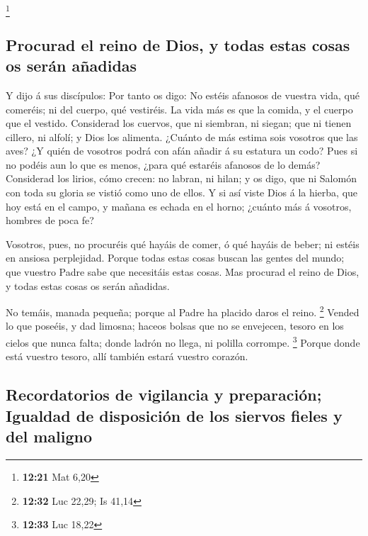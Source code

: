 \footnote{\textbf{12:21} Mat 6,20}

\hypertarget{procurad-el-reino-de-dios-y-todas-estas-cosas-os-seruxe1n-auxf1adidas}{%
\subsection{Procurad el reino de Dios, y todas estas cosas os serán
añadidas}\label{procurad-el-reino-de-dios-y-todas-estas-cosas-os-seruxe1n-auxf1adidas}}

 Y dijo á sus discípulos: Por tanto os digo: No estéis
afanosos de vuestra vida, qué comeréis; ni del cuerpo, qué vestiréis.
 La vida más es que la comida, y el cuerpo que el
vestido.  Considerad los cuervos, que ni siembran, ni
siegan; que ni tienen cillero, ni alfolí; y Dios los alimenta. ¿Cuánto
de más estima sois vosotros que las aves?  ¿Y quién de
vosotros podrá con afán añadir á su estatura un codo? 
Pues si no podéis aun lo que es menos, ¿para qué estaréis afanosos de lo
demás?  Considerad los lirios, cómo crecen: no labran, ni
hilan; y os digo, que ni Salomón con toda su gloria se vistió como uno
de ellos.  Y si así viste Dios á la hierba, que hoy está
en el campo, y mañana es echada en el horno; ¿cuánto más á vosotros,
hombres de poca fe?

 Vosotros, pues, no procuréis qué hayáis de comer, ó qué
hayáis de beber; ni estéis en ansiosa perplejidad. 
Porque todas estas cosas buscan las gentes del mundo; que vuestro Padre
sabe que necesitáis estas cosas.  Mas procurad el reino
de Dios, y todas estas cosas os serán añadidas.

 No temáis, manada pequeña; porque al Padre ha placido
daros el reino. \footnote{\textbf{12:32} Luc 22,29; Is 41,14}
 Vended lo que poseéis, y dad limosna; haceos bolsas que
no se envejecen, tesoro en los cielos que nunca falta; donde ladrón no
llega, ni polilla corrompe. \footnote{\textbf{12:33} Luc 18,22}
 Porque donde está vuestro tesoro, allí también estará
vuestro corazón.

\hypertarget{recordatorios-de-vigilancia-y-preparaciuxf3n-igualdad-de-disposiciuxf3n-de-los-siervos-fieles-y-del-maligno}{%
\subsection{Recordatorios de vigilancia y preparación; Igualdad de
disposición de los siervos fieles y del
maligno}\label{recordatorios-de-vigilancia-y-preparaciuxf3n-igualdad-de-disposiciuxf3n-de-los-siervos-fieles-y-del-maligno}}

